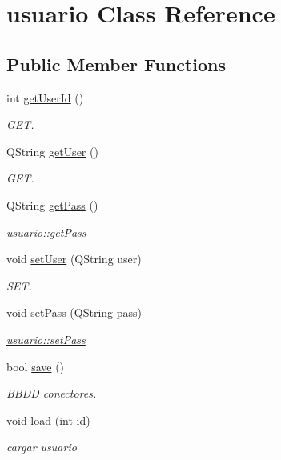 \hypertarget{classusuario}{}\section{usuario Class Reference}
\label{classusuario}
\subsection*{Public Member Functions}
\begin{DoxyCompactItemize}
\item 
\mbox{\label{classusuario_a65bf19ac5bf1b50a046918bd0a057726}} 
int \mbox{\hyperlink{classusuario_a65bf19ac5bf1b50a046918bd0a057726}{get\+User\+Id}} ()
\begin{DoxyCompactList}\small\item\em G\+ET. \end{DoxyCompactList}\item 
Q\+String \mbox{\hyperlink{classusuario_afb7157be3eac41daf4e633ce376ac8a0}{get\+User}} ()
\begin{DoxyCompactList}\small\item\em G\+ET. \end{DoxyCompactList}\item 
Q\+String \mbox{\hyperlink{classusuario_ac0a46c5a79d3c3f70fb71383522b5e44}{get\+Pass}} ()
\begin{DoxyCompactList}\small\item\em \mbox{\hyperlink{classusuario_ac0a46c5a79d3c3f70fb71383522b5e44}{usuario\+::get\+Pass}} \end{DoxyCompactList}\item 
void \mbox{\hyperlink{classusuario_adea7be5d8eb2f89a54c38d9a0a7cf847}{set\+User}} (Q\+String user)
\begin{DoxyCompactList}\small\item\em S\+ET. \end{DoxyCompactList}\item 
void \mbox{\hyperlink{classusuario_a0837dba1e902a3853cdc26dfc8a1d7ec}{set\+Pass}} (Q\+String pass)
\begin{DoxyCompactList}\small\item\em \mbox{\hyperlink{classusuario_a0837dba1e902a3853cdc26dfc8a1d7ec}{usuario\+::set\+Pass}} \end{DoxyCompactList}\item 
bool \mbox{\hyperlink{classusuario_af8164ee3562617e639d4ff25ba3b4aa1}{save}} ()
\begin{DoxyCompactList}\small\item\em B\+B\+DD conectores. \end{DoxyCompactList}\item 
void \mbox{\hyperlink{classusuario_a882737e5daa0544a3581b182645e7870}{load}} (int id)
\begin{DoxyCompactList}\small\item\em cargar usuario \end{DoxyCompactList}\end{DoxyCompactItemize}


